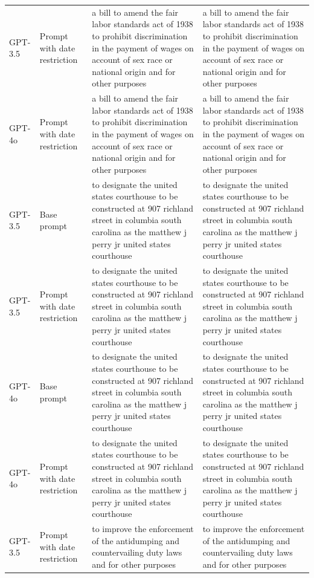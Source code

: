 \begin{longtable}{>{\raggedright\arraybackslash}p{1.4cm}>{\raggedright\arraybackslash}p{1.4cm}>{\raggedright\arraybackslash}p{5.5cm}>{\raggedright\arraybackslash}p{5.5cm}}
GPT-3.5 & Prompt with date restriction & a bill to amend the fair labor standards act of 1938 to prohibit discrimination in the payment of wages on account of sex race or national origin and for other purposes & a bill to amend the fair labor standards act of 1938 to prohibit discrimination in the payment of wages on account of sex race or national origin and for other purposes\\
GPT-4o & Prompt with date restriction & a bill to amend the fair labor standards act of 1938 to prohibit discrimination in the payment of wages on account of sex race or national origin and for other purposes & a bill to amend the fair labor standards act of 1938 to prohibit discrimination in the payment of wages on account of sex race or national origin and for other purposes\\
GPT-3.5 & Base prompt & to designate the united states courthouse to be constructed at 907 richland street in columbia south carolina as the matthew j perry jr united states courthouse & to designate the united states courthouse to be constructed at 907 richland street in columbia south carolina as the matthew j perry jr united states courthouse\\
GPT-3.5 & Prompt with date restriction & to designate the united states courthouse to be constructed at 907 richland street in columbia south carolina as the matthew j perry jr united states courthouse & to designate the united states courthouse to be constructed at 907 richland street in columbia south carolina as the matthew j perry jr united states courthouse\\
GPT-4o & Base prompt & to designate the united states courthouse to be constructed at 907 richland street in columbia south carolina as the matthew j perry jr united states courthouse & to designate the united states courthouse to be constructed at 907 richland street in columbia south carolina as the matthew j perry jr united states courthouse\\
GPT-4o & Prompt with date restriction & to designate the united states courthouse to be constructed at 907 richland street in columbia south carolina as the matthew j perry jr united states courthouse & to designate the united states courthouse to be constructed at 907 richland street in columbia south carolina as the matthew j perry jr united states courthouse\\
GPT-3.5 & Prompt with date restriction & to improve the enforcement of the antidumping and countervailing duty laws and for other purposes & to improve the enforcement of the antidumping and countervailing duty laws and for other purposes\\

\end{longtable}
